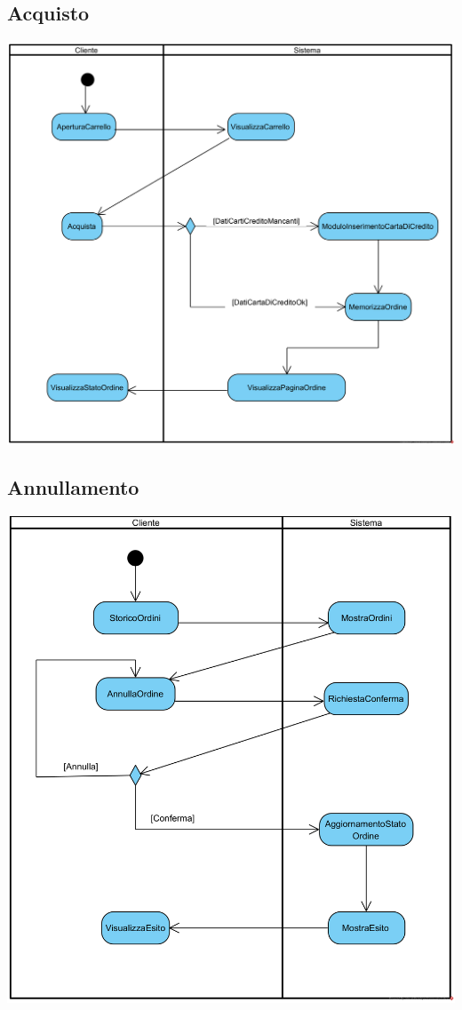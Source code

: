 \documentclass[12pt,a4paper]{article}
\begin{document}
\subsection{Acquisto}
\begin{center}
\includegraphics[width=\textwidth]{ActivityDiagram/ClienteAcquistoArticolo}
\end{center}

\subsection{Annullamento}
\begin{center}
\includegraphics[width=\textwidth]{ActivityDiagram/ClienteAnnullamentoOrdine}
\end{center}
\end{document}
